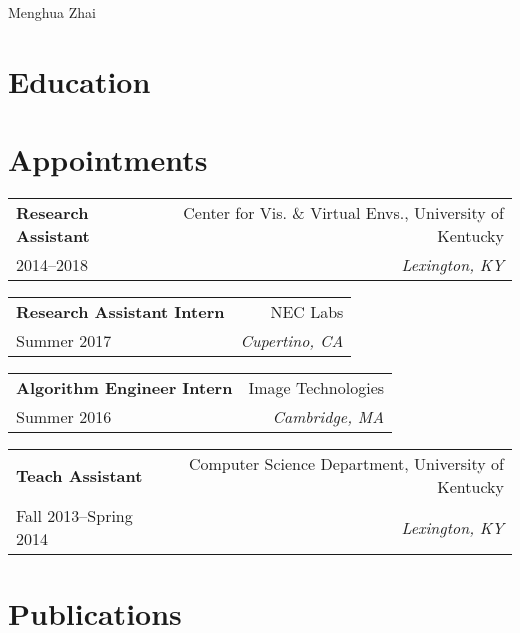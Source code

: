 \setlength{\parindent}{0pt}
\pagestyle{empty}

\begin{center}
    {\Huge \textsf{Menghua Zhai}}
\end{center}

\hrulefill 
\vspace{0.04in}

\section*{Education}


\section*{Appointments}
    
    \newcommand{\appointment}[4]{
      \begin{tabular*}{\textwidth}[t]{l@{\extracolsep{\fill}}r}
        \textbf{#1} & {#2} \\
        {#3} & \textit{#4}
      \end{tabular*}
    }

    \appointment 
      {Research Assistant}
      {Center for Vis. \& Virtual Envs., University of Kentucky}
      {2014--2018}
      {Lexington, KY}
    
    \appointment
      {Research Assistant Intern}
      {NEC Labs}
      {Summer 2017}
      {Cupertino, CA}

    \appointment
      {Algorithm Engineer Intern}
      {Image Technologies}
      {Summer 2016}
      {Cambridge, MA}

    \appointment
      {Teach Assistant}
      {Computer Science Department, University of Kentucky}
      {Fall 2013--Spring 2014}
      {Lexington, KY}
    
\section*{Publications}

    \renewcommand\bibsection{\vspace{-.5em}\subsection*{\refname}}

